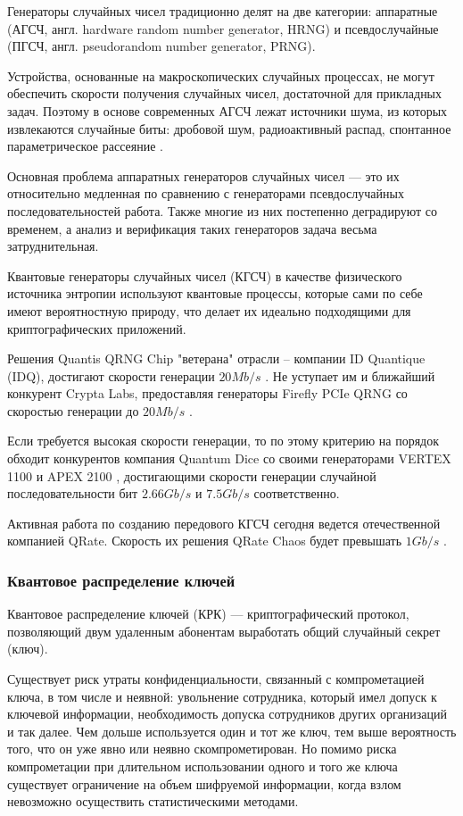 \documentclass[a4paper,12pt]{article}
\begin{document}
Генераторы случайных чисел традиционно делят на две категории: аппаратные (АГСЧ, англ. hardware random number generator, HRNG) и псевдослучайные (ПГСЧ, англ. pseudorandom number generator, PRNG).

Устройства, основанные на макроскопических случайных процессах, не могут обеспечить скорости получения случайных чисел, достаточной для прикладных задач. Поэтому в основе современных АГСЧ лежат источники шума, из которых извлекаются случайные биты: дробовой шум, радиоактивный распад, спонтанное параметрическое рассеяние \cite{Henk}.

Основная проблема аппаратных генераторов случайных чисел — это их относительно медленная по сравнению с генераторами псевдослучайных последовательностей работа. Также многие из них постепенно деградируют со временем, а анализ и верификация таких генераторов задача весьма затруднительная.

Квантовые генераторы случайных чисел (КГСЧ) в качестве физического источника энтропии используют квантовые процессы, которые сами по себе имеют вероятностную природу, что делает их идеально подходящими для криптографических приложений.

Решения Quantis QRNG Chip "ветерана" отрасли -- компании ID Quantique (IDQ), достигают скорости генерации $20 Mb/s$ \cite{Quantis_QRNG}. Не уступает им и ближайший конкурент Crypta Labs, предоставляя генераторы Firefly PCIe QRNG со скоростью генерации до $20 Mb/s$ \cite{CryptaLabs_Firefly}.

Если требуется высокая скорости генерации, то по этому критерию на порядок обходит конкурентов компания Quantum Dice со своими генераторами VERTEX 1100 \cite{QuantumDice_VERTEX} и APEX 2100 \cite{QuantumDice_APEX}, достигающими скорости генерации случайной последовательности бит $2.66 Gb/s$ и $7.5 Gb/s$ соответственно.

Активная работа по созданию передового КГСЧ сегодня ведется отечественной компанией QRate. Скорость их решения QRate Chaos будет превышать $1 Gb/s$ \cite{QRateChaos}.  


\subsubsection{Квантовое распределение ключей}

Квантовое распределение ключей (КРК) — криптографический протокол, позволяющий двум удаленным абонентам выработать общий случайный секрет (ключ).

Существует риск утраты конфиденциальности, связанный с компрометацией ключа, в том числе и неявной: увольнение сотрудника, который имел допуск к ключевой информации, необходимость допуска сотрудников других организаций и так далее. Чем дольше используется один и тот же ключ, тем выше вероятность того, что он уже явно или неявно скомпрометирован. Но помимо риска компрометации при длительном использовании одного и того же ключа существует ограничение на объем шифруемой информации, когда взлом невозможно осуществить статистическими методами.
\end{document}
